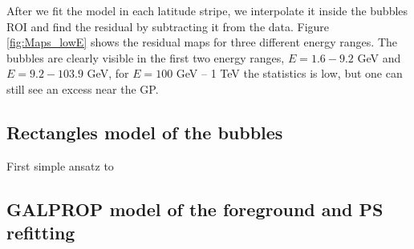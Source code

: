 After we fit the model in each latitude stripe, we interpolate it inside the bubbles ROI and find the residual by subtracting it from the data.
Figure \ref{fig:Maps_lowE} shows the residual maps for three different energy ranges. 
The \Fermi bubbles are clearly visible in the first two energy ranges, $E = 1.6 - 9.2$ GeV and $E = 9.2 - 103.9$ GeV, for 
$E = 100$ GeV -- 1 TeV the statistics is low, but one can still see an excess near the GP.

\subsection{Rectangles model of the bubbles}
\label{sec:box_model}

First simple ansatz to 


\subsection{GALPROP model of the foreground and PS refitting}
\label{sec:galprop_model}

